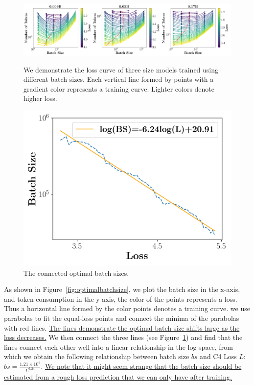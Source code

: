\begin{figure}[!htbp]
    \centering
    \begin{minipage}{0.66\textwidth}
        \centering
        \includegraphics[width=\linewidth]{Fig/batch_size_1.png}
    \caption{We demonstrate the loss curve of three size models trained using different batch sizes. Each vertical line formed by points with a gradient color represents a training curve. Lighter colors denote higher loss.}
    \label{fig:optimalbatchsize}
    \end{minipage}
    \begin{minipage}{0.3\textwidth}
        \centering
        \includegraphics[width=\linewidth]{Fig/batch_size_2.png}
        \caption{The connected optimal batch sizes. }
        \label{fig:optimalbatchsizeconnect}
    \end{minipage}
\end{figure}

As shown in Figure~\ref{fig:optimalbatchsize}, we plot the batch size in the x-axis, and token consumption in the y-axis, the color of the points represents a loss. Thus a horizontal line formed by the color points denotes a training curve. we use parabolas to fit the equal-loss points and connect the minima of the parabolas with red lines. \uline{The lines demonstrate the optimal batch size shifts large as the loss decreases.} We then connect the three lines (see Figure~\ref{fig:optimalbatchsizeconnect}) and find that the lines connect each other well into a linear relationship in the log space, from which we obtain the following relationship between batch size $bs$ and C4 Loss $L$: $ bs = \frac{1.21\times10^9}{L^{6.24}}$. \uline{We note that it might seem strange that the batch size should be estimated from a rough loss prediction that we can only have after training.}

